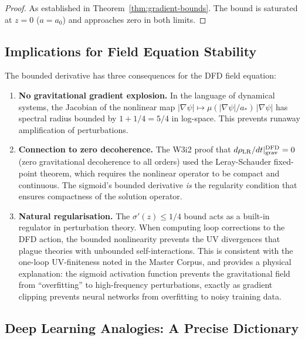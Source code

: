 \documentclass[11pt]{article}
\theoremstyle{definition}
\theoremstyle{remark}
\begin{document}
\begin{proof}
As established in Theorem~\ref{thm:gradient-bounds}. The bound is
saturated at $z = 0$ ($a = a_0$) and approaches zero in both limits.
\end{proof}

\subsection{Implications for Field Equation Stability}
\label{sec:field-stability}

The bounded derivative has three consequences for the DFD field equation:

\begin{enumerate}
\item \textbf{No gravitational gradient explosion.} In the language of
  dynamical systems, the Jacobian of the nonlinear map
  $|\nabla\psi| \mapsto \mu(|\nabla\psi|/a_*)\,|\nabla\psi|$ has
  spectral radius bounded by $1 + 1/4 = 5/4$ in log-space. This
  prevents runaway amplification of perturbations.

\item \textbf{Connection to zero decoherence.} The W3i2 proof that
  $d\rho_{\rm LR}/dt|_{\rm grav}^{\rm DFD} = 0$ (zero gravitational
  decoherence to all orders) used the Leray-Schauder fixed-point
  theorem, which requires the nonlinear operator to be compact and
  continuous. The sigmoid's bounded derivative \emph{is} the regularity
  condition that ensures compactness of the solution operator.

\item \textbf{Natural regularisation.} The $\sigma'(z) \leq 1/4$ bound
  acts as a built-in regulator in perturbation theory. When computing
  loop corrections to the DFD action, the bounded nonlinearity prevents
  the UV divergences that plague theories with unbounded self-interactions.
  This is consistent with the one-loop UV-finiteness noted in the Master
  Corpus, and provides a physical explanation: the sigmoid activation
  function prevents the gravitational field from ``overfitting'' to
  high-frequency perturbations, exactly as gradient clipping prevents
  neural networks from overfitting to noisy training data.
\end{enumerate}

\subsection{Deep Learning Analogies: A Precise Dictionary}
\label{sec:dl-dictionary}
\end{document}
